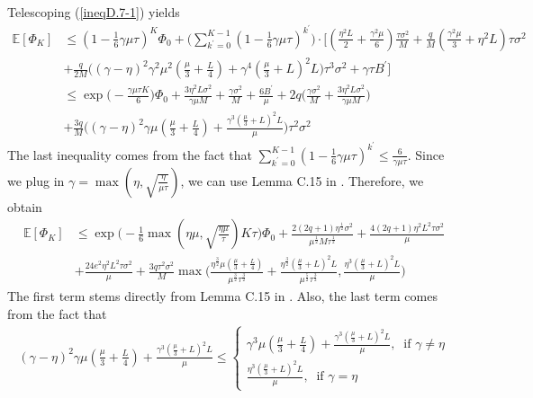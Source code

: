 \documentclass[11pt]{article}
\begin{document}
Telescoping (\ref{ineqD.7-1}) yields
\begin{align*}
    \mathbb{E}[\Phi_{K}] &\leq (1-\frac{1}{6}\gamma\mu\tau)^K\Phi_0 + \Big(\sum_{k^\prime=0}^{K-1}(1-\frac{1}{6}\gamma\mu\tau)^{k^\prime}\Big)\cdot \Big[(\frac{\eta^2 L}{2} + \frac{\gamma^2\mu}{6})\frac{\tau\sigma^2}{M} + \frac{q}{M}(\frac{\gamma^2\mu}{3}+\eta^2 L)\tau\sigma^2 \nonumber\\
     &+ \frac{q}{2M}\Big( (\gamma-\eta)^2 \gamma^2\mu^2 (\frac{\mu}{3} + \frac{L}{4}) + \gamma^4 (\frac{\mu}{3} + L)^2 L \Big)\tau^3\sigma^2 +\gamma\tau B^\prime \Big] \\
     &\leq \exp\Big(-\frac{\gamma\mu\tau K}{6}\Big)\Phi_0 + \frac{3\eta^2 L\sigma^2}{\gamma\mu M} + \frac{\gamma\sigma^2}{M} + \frac{6B^\prime}{\mu} + 2q\Big(\frac{\gamma\sigma^2}{M}+\frac{3\eta^2 L\sigma^2}{\gamma\mu M}\Big) \\
     &+ \frac{3q}{M}\Big( (\gamma-\eta)^2 \gamma\mu (\frac{\mu}{3} + \frac{L}{4}) + \frac{\gamma^3 (\frac{\mu}{3} + L)^2 L}{\mu} \Big)\tau^2\sigma^2
\end{align*}
The last inequality comes from the fact that $\sum_{k^\prime=0}^{K-1}(1-\frac{1}{6}\gamma\mu\tau)^{k^\prime} \leq \frac{6}{\gamma\mu\tau}$. Since we plug in $\gamma = \max(\eta, \sqrt{\frac{\eta}{\mu\tau}})$, we can use Lemma C.15 in \cite{Yeojoon-yuan2020federated}. Therefore, we obtain
\begin{align*}
    \mathbb{E}[\Phi_K] &\leq \exp{\Big(-\frac{1}{6}\max(\eta\mu, \sqrt{\frac{\eta\mu}{\tau}})K\tau\Big)} \Phi_0 + \frac{2(2q+1)\eta^{\frac{1}{2}}\sigma^2}{\mu^{\frac{1}{2}}M\tau^{\frac{1}{2}}} + \frac{4(2q+1)\eta^2 L^2\tau\sigma^2}{\mu} \\
    &+ \frac{24e^2\eta^2 L^2\tau\sigma^2}{\mu} + \frac{3q\tau^2\sigma^2}{M}\max\Big(\frac{\eta^{\frac{3}{2}}\mu(\frac{\mu}{3}+\frac{L}{4})}{\mu^{\frac{3}{2}}\tau^{\frac{3}{2}}}+\frac{\eta^{\frac{3}{2}}(\frac{\mu}{3}+L)^2 L}{\mu^{\frac{5}{2}}\tau^{\frac{3}{2}}}, \frac{\eta^3 (\frac{\mu}{3}+L)^2 L}{\mu}\Big)
\end{align*}
The first term stems directly from Lemma C.15 in \cite{Yeojoon-yuan2020federated}. Also, the last term comes from the fact that
\begin{align*}
    (\gamma-\eta)^2 \gamma\mu (\frac{\mu}{3} + \frac{L}{4}) + \frac{\gamma^3 (\frac{\mu}{3} + L)^2 L}{\mu} \leq
    \begin{cases}
    \gamma^3\mu(\frac{\mu}{3}+\frac{L}{4}) + \frac{\gamma^3(\frac{\mu}{3}+L)^2 L}{\mu},~\textrm{ if }\gamma \neq \eta\\
    \frac{\eta^3 (\frac{\mu}{3}+L)^2 L}{\mu},~\textrm{ if } \gamma=\eta
    \end{cases}
\end{align*}
\end{document}
